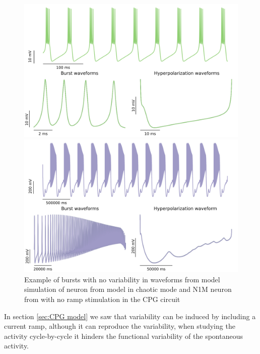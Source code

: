 \begin{figure}[hbt]
	\centering
	\begin{minipage}{0.48\textwidth}
		\includegraphics[width=\textwidth]{img/invariants/variability/GHmodel.png}
	\end{minipage}
	\begin{minipage}{0.48\textwidth}
		\includegraphics[width=\textwidth]{img/invariants/variability/N1Mnovar.png}
	\end{minipage}
	\caption{Example of bursts with no variability in waveforms from model simulation of neuron from \cite{ghigliazza_minimal_2004} model in chaotic mode and N1M neuron from \cite{vavoulis_dynamic_2007} with no ramp stimulation in the CPG circuit}
	\label{fig:model burst no variability}
\end{figure}



In section \ref{sec:CPG model} we saw that variability can be induced by including a current ramp, although it can reproduce the variability, when studying the activity cycle-by-cycle it hinders the functional variability of the spontaneous activity. 


